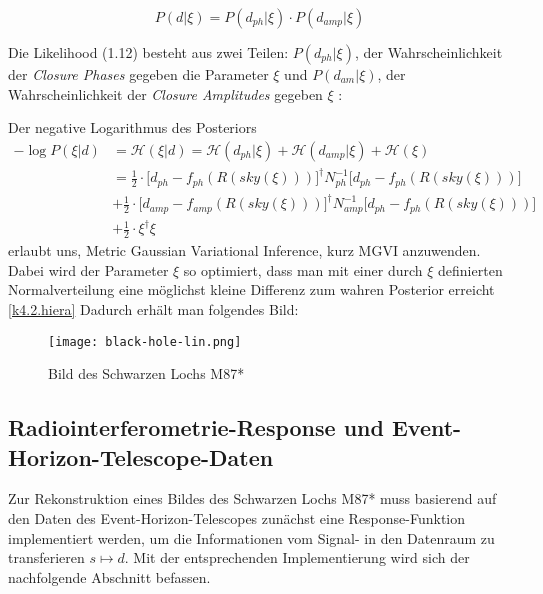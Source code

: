 \begin{equation}
P(d|\xi)=  {P(d_{ph}|\xi)\cdot P(d_{amp}|\xi)}    
\end{equation}

Die Likelihood (1.12) besteht aus zwei Teilen: $P(d_{ph}|\xi)$, der Wahrscheinlichkeit der \emph{Closure Phases} gegeben die Parameter $\xi$ und $P(d_{am}| \xi)$, der Wahrscheinlichkeit der \emph{Closure Amplitudes} gegeben $\xi$ : 

Der negative Logarithmus des Posteriors
\begin{align} \label{k4.2.Posterior}
 -\log {P(\xi|d)} &= 
 \mathcal{H} (\xi|d) = \mathcal{H} (d_{ph}|\xi)+\mathcal{H} (d_{amp}|\xi)+\mathcal{H} (\xi) \\
&= \frac {1}{2}\cdot \Bigg[d_{ph} - f_{ph}(R(sky(\xi))) \Bigg]^\dagger N^{-1}_{ph} \Bigg[d_{ph} - f_{ph}(R(sky(\xi))) \Bigg] 
\\  & + \frac {1}{2}\cdot \Bigg[d_{amp} - f_{amp}(R(sky(\xi))) \Bigg]^\dagger N_{amp}^{-1}\Bigg[d_{ph} - f_{ph}(R(sky(\xi))) \Bigg] \nonumber
\\ & +  \frac {1}{2} \cdot \xi^\dagger \xi \nonumber  
\end{align} 
 erlaubt uns, Metric Gaussian Variational Inference, kurz MGVI \parencite{k4.2.mgvi} anzuwenden. Dabei wird der Parameter $\xi$ so optimiert, dass man mit einer durch $\xi$ definierten Normalverteilung eine möglichst kleine Differenz zum wahren Posterior erreicht \cref{k4.2.hiera}
Dadurch erhält man folgendes Bild:

\begin{figure}
    \centering
    \texttt{[image: black-hole-lin.png]}
    \caption{Bild des Schwarzen Lochs M87*}
    \label{k4.2.black-hole-lin}
\end{figure}





\subsection{Radiointerferometrie-Response und Event-Horizon-Telescope-Daten}

Zur Rekonstruktion eines Bildes des Schwarzen Lochs M87* muss basierend auf den Daten des Event-Horizon-Telescopes zunächst eine Response-Funktion implementiert werden, um die Informationen vom Signal- in den Datenraum zu transferieren $s \mapsto d$. Mit der entsprechenden Implementierung wird sich der nachfolgende Abschnitt befassen.

